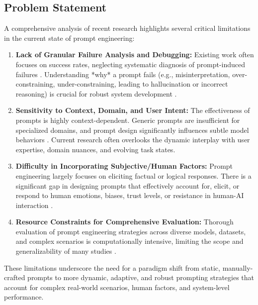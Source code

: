 \documentclass{article}
\begin{document}
\subsection{Problem Statement}
A comprehensive analysis of recent research highlights several critical limitations in the current state of prompt engineering:
\begin{enumerate}[label=\arabic*.]
    \item \textbf{Lack of Granular Failure Analysis and Debugging:} Existing work often focuses on success rates, neglecting systematic diagnosis of prompt-induced failures \cite{paper1}. Understanding *why* a prompt fails (e.g., misinterpretation, over-constraining, under-constraining, leading to hallucination or incorrect reasoning) is crucial for robust system development \cite{paper5}.
    \item \textbf{Sensitivity to Context, Domain, and User Intent:} The effectiveness of prompts is highly context-dependent. Generic prompts are insufficient for specialized domains, and prompt design significantly influences subtle model behaviors \cite{paper3, paper5}. Current research often overlooks the dynamic interplay with user expertise, domain nuances, and evolving task states.
    \item \textbf{Difficulty in Incorporating Subjective/Human Factors:} Prompt engineering largely focuses on eliciting factual or logical responses. There is a significant gap in designing prompts that effectively account for, elicit, or respond to human emotions, biases, trust levels, or resistance in human-AI interaction \cite{paper2}.
    \item \textbf{Resource Constraints for Comprehensive Evaluation:} Thorough evaluation of prompt engineering strategies across diverse models, datasets, and complex scenarios is computationally intensive, limiting the scope and generalizability of many studies \cite{paper5}.
\end{enumerate}
These limitations underscore the need for a paradigm shift from static, manually-crafted prompts to more dynamic, adaptive, and robust prompting strategies that account for complex real-world scenarios, human factors, and system-level performance.
\end{document}
